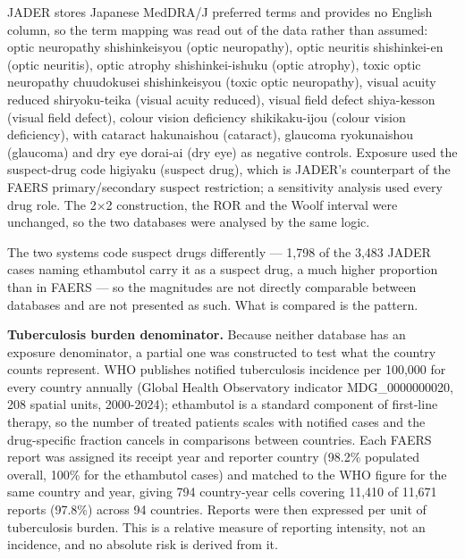 \documentclass[utf8]{FrontiersinVancouver}
\begin{document}
JADER stores Japanese MedDRA/J preferred terms and provides no English column, so the term mapping was read out of the data rather than assumed: optic neuropathy shishinkeisyou (optic neuropathy), optic neuritis shishinkei-en (optic neuritis), optic atrophy shishinkei-ishuku (optic atrophy), toxic optic neuropathy chuudokusei shishinkeisyou (toxic optic neuropathy), visual acuity reduced shiryoku-teika (visual acuity reduced), visual field defect shiya-kesson (visual field defect), colour vision deficiency shikikaku-ijou (colour vision deficiency), with cataract hakunaishou (cataract), glaucoma ryokunaishou (glaucoma) and dry eye dorai-ai (dry eye) as negative controls. Exposure used the suspect-drug code higiyaku (suspect drug), which is JADER's counterpart of the FAERS primary/secondary suspect restriction; a sensitivity analysis used every drug role. The 2$\times$2 construction, the ROR and the Woolf interval were unchanged, so the two databases were analysed by the same logic.

The two systems code suspect drugs differently --- 1,798 of the 3,483 JADER cases naming ethambutol carry it as a suspect drug, a much higher proportion than in FAERS --- so the magnitudes are not directly comparable between databases and are not presented as such. What is compared is the pattern.

\textbf{Tuberculosis burden denominator.} Because neither database has an exposure denominator, a partial one was constructed to test what the country counts represent. WHO publishes notified tuberculosis incidence per 100,000 for every country annually (Global Health Observatory indicator MDG\_0000000020, 208 spatial units, 2000-2024); ethambutol is a standard component of first-line therapy, so the number of treated patients scales with notified cases and the drug-specific fraction cancels in comparisons between countries. Each FAERS report was assigned its receipt year and reporter country (98.2\% populated overall, 100\% for the ethambutol cases) and matched to the WHO figure for the same country and year, giving 794 country-year cells covering 11,410 of 11,671 reports (97.8\%) across 94 countries. Reports were then expressed per unit of tuberculosis burden. This is a relative measure of reporting intensity, not an incidence, and no absolute risk is derived from it.
\end{document}
